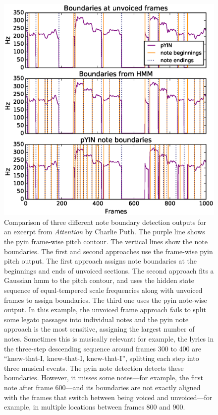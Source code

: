 \begin{figure}[t]
    \centering
    \includegraphics[width=\columnwidth]{figures/note_parse_comparison_attention_5.eps}
    \caption{Comparison of three different note boundary detection outputs for an excerpt from \textit{Attention} by Charlie Puth. The purple line shows the \gls{pyin} frame-wise pitch contour. The vertical lines show the note boundaries. The first and second approaches use the frame-wise \gls{pyin} pitch output. The first approach assigns note boundaries at the beginnings and ends of unvoiced sections. The second approach fits a Gaussian \gls{hmm} to the pitch contour, and uses the hidden state sequence of equal-tempered scale frequencies along with unvoiced frames to assign boundaries. The third one uses the \gls{pyin} note-wise output. In this example, the unvoiced frame approach fails to split some legato passages into individual notes and the \gls{pyin} note approach is the most sensitive, assigning the largest number of notes. Sometimes this is musically relevant: for example, the lyrics in the three-step descending sequence around frames 300 to 400 are ``knew-that-I, knew-that-I, knew-that-I'', splitting each step into three musical events. The \gls{pyin} note detection detects these boundaries. However, it misses some notes---for example, the first note after frame 600---and its boundaries are not exactly aligned with the frames that switch between being voiced and unvoiced---for example, in multiple locations between frames 800 and 900.}
    \label{fig:note-parsing}
\end{figure}

